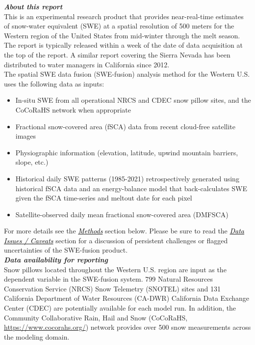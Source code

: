 \documentclass{article}
\begin{document}
\noindent\textbf{\textit{About this report}}\\
This is an experimental research product that provides near-real-time estimates of snow-water equivalent (SWE) at a spatial resolution of 500 meters for the Western region of the United States from mid-winter through the melt season. The report is typically released within a week of the date of data acquisition at the top of the report. A similar report covering the Sierra Nevada has been distributed to water managers in California since 2012.\\

\noindent
The spatial SWE data fusion (SWE-fusion) analysis method for the Western U.S. uses the following data as inputs:
\begin{itemize}[label=-]
    \item In-situ SWE from all operational NRCS and CDEC snow pillow sites, and the CoCoRaHS network when appropriate
    \item Fractional snow-covered area (fSCA) data from recent cloud-free satellite images
    \item Physiographic information (elevation, latitude, upwind mountain barriers, slope, etc.)
    \item Historical daily SWE patterns (1985-2021) retrospectively generated using historical fSCA data and an energy-balance model that back-calculates SWE given the fSCA time-series and meltout date for each pixel
    \item Satellite-observed daily mean fractional snow-covered area (DMFSCA)
\end{itemize}

\noindent For more details see the \hyperref[sec:methods]{\textcolor{black}{\textit{Methods}}} section below. Please be sure to read the \hyperref[sec:data_issues]{\textcolor{black}{\textit{Data Issues / Caveats}}} section for a discussion of persistent challenges or flagged uncertainties of the SWE-fusion product.\\

\newpage
\noindent\textbf{\textit{Data availability for reporting}}\\
Snow pillows located throughout the Western U.S. region are input as the dependent variable in the SWE-fusion system. 799 Natural Resources Conservation Service (NRCS) Snow Telemetry (SNOTEL) sites and 131 California Department of Water Resources (CA-DWR) California Data Exchange Center (CDEC) are potentially available for each model run. In addition, the Community Collaborative Rain, Hail and Snow (CoCoRaHS, \href{https://www.cocorahs.org/}{https://www.cocorahs.org/}) network provides over 500 snow measurements across the modeling domain.\\
\end{document}
